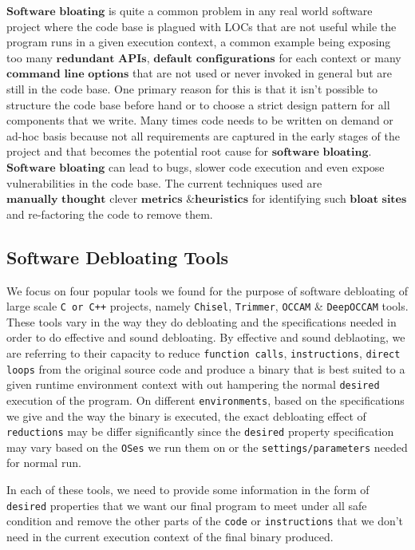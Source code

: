 \documentclass{relatorio}
\begin{document}
$\textbf{Software bloating}$ is quite a common problem in any real world software project where the code base is plagued with LOCs that are not useful while the program runs in a given execution context, a common example being exposing too many $\textbf{redundant APIs}$, $\textbf{default configurations}$ for each context or many $\textbf{command line options}$ that are not used or never invoked in general but are still in the code base. One primary reason for this is that it isn't possible to structure the code base before hand or to choose a strict design pattern for all components that we write. Many times code needs to be written on demand or ad-hoc basis because not all requirements are captured in the early stages of the project and that becomes the potential root cause for $\textbf{software bloating}$. $\textbf{Software bloating}$ can lead to bugs, slower code execution and even expose vulnerabilities in the code base. The current techniques used are $\textbf{manually thought}$ clever $\textbf{metrics \& heuristics}$ for identifying such $\textbf{bloat sites}$ and re-factoring the code to remove them. 

\subsection{Software Debloating Tools}%

We focus on four popular tools we found for the purpose of software debloating of large scale \texttt{C or C++} projects, namely \texttt{Chisel}, \texttt{Trimmer}, \texttt{OCCAM} \& \texttt{DeepOCCAM} tools. These tools vary in the way they do debloating and the specifications needed in order to do effective and sound debloating. By effective and sound deblaoting, we are referring to their capacity to reduce \texttt{function calls}, \texttt{instructions}, \texttt{direct loops}  from the original source code and produce a binary that is best suited to a given runtime 
environment context with out hampering the normal \texttt{desired} execution of the program. On different \texttt{environments}, based on the specifications we give and the way the binary is executed, the exact debloating effect of \texttt{reductions} may be differ significantly since the \texttt{desired} property specification may vary based on the \texttt{OSes} we run them on or the \texttt{settings/parameters} needed for normal run. 

In each of these tools, we need to provide some information in the form of \texttt{desired} properties that we want our final program to meet under all safe condition and remove the other parts of the \texttt{code} or \texttt{instructions} that we don't need in the current execution context of the final binary produced.  
\end{document}
